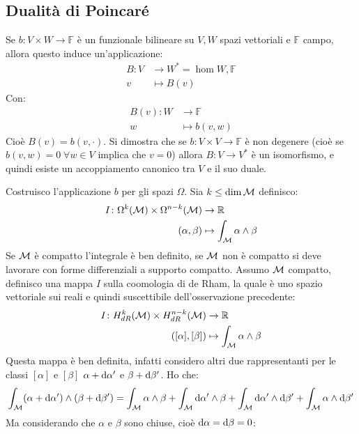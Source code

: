 \subsection{Dualità di Poincaré}
\begin{osservation}
  Se $ b \colon V \times W \to \mathbb{F} $ è un funzionale bilineare su $ V,W $ spazi
  vettoriali e $ \mathbb{F} $ campo, allora questo induce un'applicazione:
  \begin{align*}
    B \colon V & \to W^* = \hom{W, \mathbb{F}} \\
    v & \mapsto B(v)
  \end{align*}
  Con:
  \begin{align*}
    B(v) \colon W & \to \mathbb{F} \\
    w & \mapsto b(v,w)
  \end{align*}
  Cioè $ B(v) = b(v, \cdot) $. Si dimostra che se $ b \colon V \times V \to \mathbb{F} $
  è non degenere (cioè se $ b(v,w) = 0 \; \forall w \in V $ implica che $ v = 0$) allora
  $ B \colon V \to V^* $ è un isomorfismo, e quindi esiste un accoppiamento canonico tra
  $ V $ e il suo duale.
\end{osservation}
Costruisco l'applicazione $ b $ per gli spazi $ \Omega $. Sia $ k \leq \dim \mathcal{M} $ definisco:
\begin{align*}
  I \colon \Omega^k(\mathcal{M}) \times \Omega^{n-k}(\mathcal{M}) & \to \mathbb{R}^{} \\
  (\alpha,\beta) & \mapsto \int_{\mathcal{M}} \alpha \wedge \beta
\end{align*}
Se $ \mathcal{M} $ è compatto l'integrale è ben definito, se $ \mathcal{M} $ non è compatto si
deve lavorare con forme differenziali a supporto compatto. Assumo $ \mathcal{M} $
compatto, definisco una mappa $ I $ sulla coomologia di de Rham, la quale è uno
spazio vettoriale sui reali e quindi suscettibile dell'osservazione precedente:
\begin{align*}
  I \colon H^k_{dR}(\mathcal{M}) \times H^{n-k}_{dR}(\mathcal{M}) & \to \mathbb{R}^{} \\
  ([\alpha], [\beta]) & \mapsto \int_{\mathcal{M}} \alpha \wedge \beta
\end{align*}
Questa mappa è ben definita, infatti considero altri due rappresentanti per le
classi $ [\alpha] $ e $ [\beta] $ $ \alpha + \operatorname{d}\!{\alpha}' $ e $ \beta + \operatorname{d}\!{\beta}' $. Ho che:
\[
  \int_{\mathcal{M}} (\alpha + \operatorname{d}\!{\alpha}') \wedge (\beta + \operatorname{d}\!{\beta}') = \int_{\mathcal{M}} \alpha \wedge \beta + \int_{\mathcal{M}} \operatorname{d}\!{\alpha}' \wedge \beta + \int_{\mathcal{M}} \operatorname{d}\!{\alpha}' \wedge \operatorname{d}\!{\beta}' + \int_{\mathcal{M}} \alpha \wedge \operatorname{d}\!{\beta}'
\]
Ma considerando che $ \alpha $ e $ \beta $ sono chiuse, cioè $ \operatorname{d}\!{\alpha} = \operatorname{d}\!{\beta} = 0 $:
